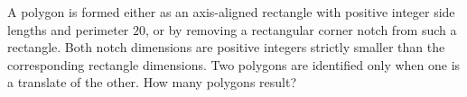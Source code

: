 A polygon is formed either as an axis-aligned rectangle with positive integer side lengths and perimeter $20$, or by removing a rectangular corner notch from such a rectangle. Both notch dimensions are positive integers strictly smaller than the corresponding rectangle dimensions. Two polygons are identified only when one is a translate of the other. How many polygons result?
